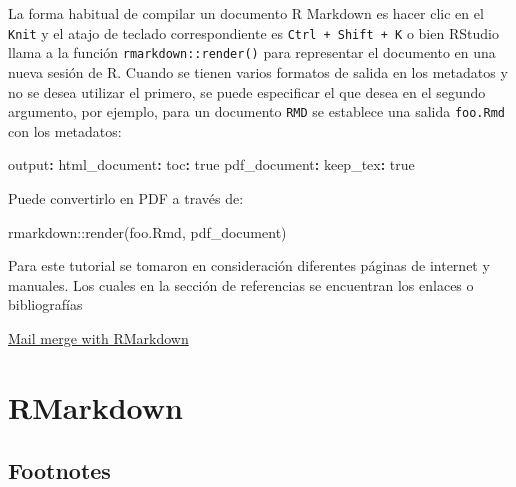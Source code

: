 \documentclass[
]{book}
\makeatletter
\newenvironment{Shaded}{\begin{snugshade}}{\end{snugshade}}
\newcommand{\AttributeTok}[1]{\textcolor[rgb]{0.77,0.63,0.00}{#1}}
\newcommand{\CharTok}[1]{\textcolor[rgb]{0.31,0.60,0.02}{#1}}
\newcommand{\FunctionTok}[1]{\textcolor[rgb]{0.00,0.00,0.00}{#1}}
\newcommand{\KeywordTok}[1]{\textcolor[rgb]{0.13,0.29,0.53}{\textbf{#1}}}
\newcommand{\NormalTok}[1]{#1}
\newcommand{\SpecialCharTok}[1]{\textcolor[rgb]{0.00,0.00,0.00}{#1}}
\newcommand{\StringTok}[1]{\textcolor[rgb]{0.31,0.60,0.02}{#1}}
\newenvironment{kframe}{%
\medskip{}
\setlength{\fboxsep}{.8em}
 \def\at@end@of@kframe{}%
 \ifinner\ifhmode%
  \def\at@end@of@kframe{\end{minipage}}%
  \begin{minipage}{\columnwidth}%
 \fi\fi%
 \def\FrameCommand##1{\hskip\@totalleftmargin \hskip-\fboxsep
 \colorbox{shadecolor}{##1}\hskip-\fboxsep
     \hskip-\linewidth \hskip-\@totalleftmargin \hskip\columnwidth}%
 \MakeFramed {\advance\hsize-\width
   \@totalleftmargin\z@ \linewidth\hsize
   \@setminipage}}%
 {\par\unskip\endMakeFramed%
 \at@end@of@kframe}
\newenvironment{rmdblock}[1]
  {
  \begin{itemize}
  \renewcommand{\labelitemi}{
    \raisebox{-.7\height}[0pt][0pt]{
      {\setkeys{Gin}{width=3em,keepaspectratio}\texttt{[image: images/\#1]}}
    }
  }
  \setlength{\fboxsep}{1em}
  \begin{kframe}
  \item
  }
  {
  \end{kframe}
  \end{itemize}
  }
\newenvironment{rmdimportant}
  {\begin{rmdblock}{important}}
  {\end{rmdblock}}
\makeatother
\begin{document}
La forma habitual de compilar un documento R Markdown es hacer clic en el \texttt{Knit} y el atajo de teclado correspondiente es \texttt{Ctrl\ +\ Shift\ +\ K} o bien RStudio llama a la función \texttt{rmarkdown::render()} para representar el documento en una nueva sesión de R. Cuando se tienen varios formatos de salida en los metadatos y no se desea utilizar el primero, se puede especificar el que desea en el segundo argumento, por ejemplo, para un documento \texttt{RMD} se establece una salida \texttt{foo.Rmd} con los metadatos:

\begin{Shaded}
\begin{Highlighting}[]
\FunctionTok{output}\KeywordTok{:}
\AttributeTok{  }\FunctionTok{html\_document}\KeywordTok{:}
\AttributeTok{    }\FunctionTok{toc}\KeywordTok{:}\AttributeTok{ }\CharTok{true}
\AttributeTok{  }\FunctionTok{pdf\_document}\KeywordTok{:}
\AttributeTok{    }\FunctionTok{keep\_tex}\KeywordTok{:}\AttributeTok{ }\CharTok{true}
\end{Highlighting}
\end{Shaded}

Puede convertirlo en PDF a través de:

\begin{Shaded}
\begin{Highlighting}[]
\NormalTok{rmarkdown}\SpecialCharTok{::}\FunctionTok{render}\NormalTok{(}\StringTok{\textquotesingle{}foo.Rmd\textquotesingle{}}\NormalTok{, }\StringTok{\textquotesingle{}pdf\_document\textquotesingle{}}\NormalTok{)}
\end{Highlighting}
\end{Shaded}

\begin{rmdimportant}
Para este tutorial se tomaron en consideración diferentes páginas de internet y manuales. Los cuales en la sección de referencias se encuentran los enlaces o bibliografías\\
\end{rmdimportant}

\href{https://rmarkdown.rstudio.com/articles_mail_merge.html}{Mail merge with RMarkdown}

\hypertarget{rmarkdown-1}{%
\chapter{RMarkdown}\label{rmarkdown-1}}

\hypertarget{footnotes}{%
\section{Footnotes}\label{footnotes}}
\end{document}
